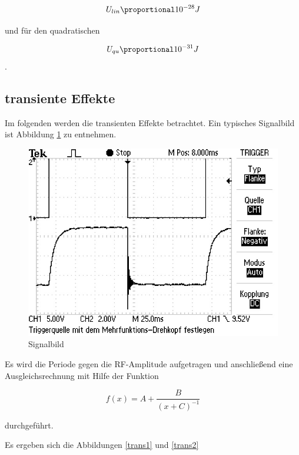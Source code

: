 \begin{equation}
	U_{lin} \proportional 10^{-28} J
\end{equation}

und für den quadratischen

\begin{equation}
	U_{qu} \proportional 10^{-31} J
\end{equation}
.


\subsection{transiente Effekte}
Im folgenden werden die transienten Effekte betrachtet. Ein typisches Signalbild ist Abbildung \ref{sigPic} zu entnehmen.

\begin{figure}[h]
\centering
\includegraphics[scale=0.8]{img/TEK0019.JPG}
\caption{Signalbild}
\label{sigPic}
\end{figure}

Es wird die Periode gegen die RF-Amplitude aufgetragen und anschließend eine Ausgleichsrechnung mit Hilfe der Funktion

\begin{equation}
f(x) = A + \frac{B}{(x+C)^{-1}}
\end{equation}

durchgeführt.

Es ergeben sich die Abbildungen \ref{trans1} und \ref{trans2}

